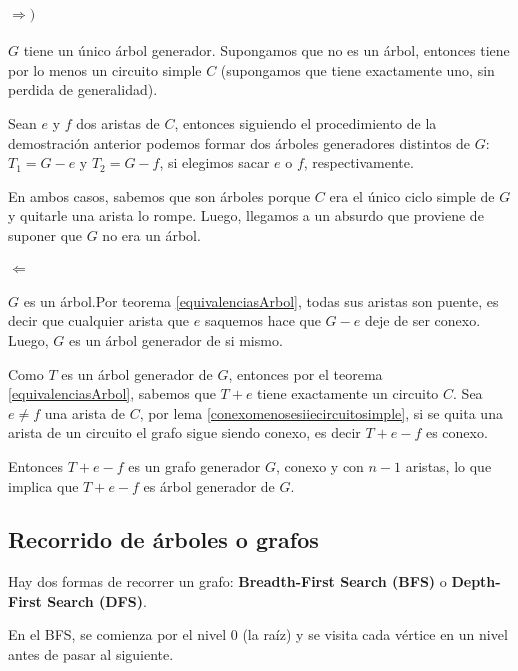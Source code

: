 \begin{demo}[DE 2]
	\paragraph{\(\Rightarrow)\)} \(G\) tiene un único árbol generador. Supongamos que no es un árbol, entonces tiene por lo menos un circuito simple \(C\) (supongamos que tiene exactamente uno, sin perdida de generalidad). 
	
	Sean \(e\) y \(f\) dos aristas de \(C\), entonces siguiendo el procedimiento de la demostración anterior podemos formar dos árboles generadores distintos de \(G\): \(T_1 = G - e\) y \(T_2 = G -f\), si elegimos sacar \(e\) o \(f\), respectivamente.
	
	En ambos casos, sabemos que son árboles porque \(C\) era el único ciclo simple de \(G\) y quitarle una arista lo rompe. Luego, llegamos a un absurdo que proviene de suponer que \(G\) no era un árbol.
	
	\paragraph{\(\Leftarrow\)} \(G\) es un árbol.Por teorema \ref{equivalenciasArbol}, todas sus aristas son puente, es decir que cualquier arista que \(e\) saquemos hace que \(G - e\) deje de ser conexo. Luego, \(G\) es un árbol generador de si mismo.
\end{demo}

\begin{demo}[DE 3]
	Como \(T\) es un árbol generador de \(G\), entonces por el teorema \ref{equivalenciasArbol}, sabemos que \(T + e\) tiene exactamente un circuito \(C\). Sea \(e\neq f\) una arista de \(C\), por lema \ref{conexomenosesiiecircuitosimple}, si se quita una arista de un circuito el grafo sigue siendo conexo, es decir \(T + e - f\) es conexo.
	
	Entonces \(T + e - f\) es un grafo generador \(G\), conexo y con \(n-1\) aristas, lo que implica que \(T + e - f\) es árbol generador de \(G\).
\end{demo}

\subsection{Recorrido de árboles o grafos}
Hay dos formas de recorrer un grafo: \textbf{Breadth-First Search (BFS)} o \textbf{Depth-First Search (DFS)}.

En el BFS, se comienza por el nivel 0 (la raíz) y se visita cada vértice en un nivel antes de pasar al siguiente.

